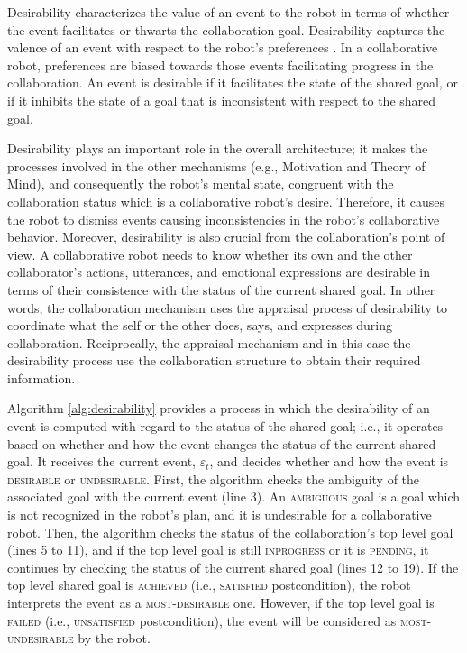 \documentclass{aamas2016}
\begin{document}
Desirability characterizes the value of an event to the robot in terms of
whether the event facilitates or thwarts the collaboration goal. Desirability
captures the valence of an event with respect to the robot's preferences
\cite{gratch:domain-independent}. In a collaborative robot, preferences are
biased towards those events facilitating progress in the collaboration. An event
is desirable if it facilitates the state of the shared goal, or if it inhibits
the state of a goal that is inconsistent with respect to the shared goal.

Desirability plays an important role in the overall architecture; it makes the
processes involved in the other mechanisms (e.g., Motivation and Theory of
Mind), and consequently the robot's mental state, congruent with the
collaboration status which is a collaborative robot's desire. Therefore, it
causes the robot to dismiss events causing inconsistencies in the robot's
collaborative behavior. Moreover, desirability is also crucial from the
collaboration's point of view. A collaborative robot needs to know whether its
own and the other collaborator's actions, utterances, and emotional expressions
are desirable in terms of their consistence with the status of the current
shared goal. In other words, the collaboration mechanism uses the appraisal
process of desirability to coordinate what the self or the other does, says, and
expresses during collaboration. Reciprocally, the appraisal mechanism and in
this case the desirability process use the collaboration structure to obtain
their required information.

Algorithm \ref{alg:desirability} provides a process in which the desirability of
an event is computed with regard to the status of the shared goal; i.e., it
operates based on whether and how the event changes the status of the current
shared goal. It receives the current event, $\varepsilon_t$, and decides whether
and how the event is \textsc{desirable} or \textsc{undesirable}. First, the
algorithm checks the ambiguity of the associated goal with the current event
(line 3). An \textsc{ambiguous} goal is a goal which is not recognized in the
robot's plan, and it is undesirable for a collaborative robot. Then, the
algorithm checks the status of the collaboration's top level goal (lines 5 to
11), and if the top level goal is still \textsc{inprogress} or it is
\textsc{pending}, it continues by checking the status of the current shared goal
(lines 12 to 19). If the top level shared goal is \textsc{achieved} (i.e.,
\textsc{satisfied} postcondition), the robot interprets the event as a
\textsc{most-desirable} one. However, if the top level goal is \textsc{failed}
(i.e., \textsc{unsatisfied} postcondition), the event will be considered as
\textsc{most-undesirable} by the robot.
\end{document}
